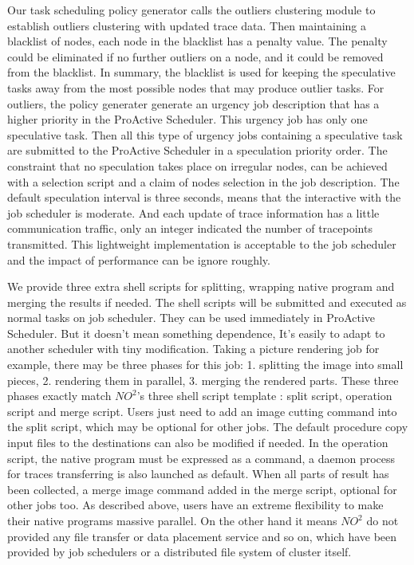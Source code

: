 Our task scheduling policy generator calls the outliers clustering module to establish outliers clustering with updated trace data. Then maintaining a blacklist of nodes, each node in the blacklist has a penalty value. The penalty could be eliminated if no further outliers on a node, and it could be removed from the blacklist. In summary, the blacklist is used for keeping the speculative tasks away from the most possible nodes that may produce outlier tasks. For outliers, the policy generater generate an urgency job description that has a higher priority in the ProActive Scheduler. This urgency job has only one speculative task. Then all this type of urgency jobs containing a speculative task are submitted to the ProActive Scheduler in a speculation priority order. The constraint that no speculation takes place on irregular nodes, can be achieved with a selection script and a claim of nodes selection in the job description. The default speculation interval is three seconds, means that the interactive with the job scheduler is moderate. And each update of trace information has a little communication traffic, only an integer indicated the number of  tracepoints transmitted. This lightweight implementation is acceptable to the job scheduler and the impact of performance can be ignore roughly.

We provide three extra shell scripts for splitting, wrapping native program and merging the results if needed. The shell scripts will be submitted and executed as normal tasks on job scheduler. They can be used immediately in ProActive Scheduler. But it doesn't mean something dependence, It’s easily to adapt to another scheduler with tiny modification. Taking a picture rendering job for example, there may be three phases for this job: 1. splitting the image into small pieces, 2. rendering them in parallel, 3. merging the rendered parts. These three phases exactly match $NO^2$'s three shell script template : split script, operation script and merge script. Users just need to add an image cutting command into the split script, which may be optional for other jobs. The default procedure copy input files to the destinations can also be modified if needed. In the operation script, the native program must be expressed as a command, a daemon process for traces transferring is also launched as default. When all parts of result has been collected, a merge image command added in the merge script, optional for other jobs too. As described above,  users have an extreme flexibility to make their native programs massive parallel. On the other hand it means $NO^2$ do not provided any file transfer or data placement service and so on, which have been provided by job schedulers or a distributed file system of cluster itself.
